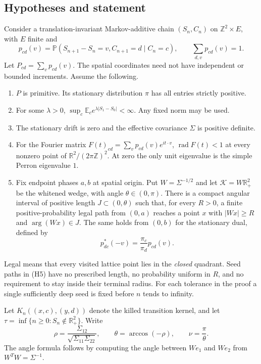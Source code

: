 \documentclass[11pt,letterpaper]{article}
\numberwithin{equation}{section}
\theoremstyle{remark}\newtheorem{remark}[theorem]{Remark}
\newcommand{\PP}{\mathbb P}
\newcommand{\EE}{\mathbb E}
\newcommand{\ZZ}{\mathbb Z}
\newcommand{\RR}{\mathbb R}
\newcommand{\rad}{\operatorname{rad}}
\newcommand{\argu}{\operatorname{arg}}
\begin{document}
\subsection{Hypotheses and statement}
Consider a translation-invariant Markov-additive chain $(S_n,C_n)$ on
$\ZZ^2\times E$, with $E$ finite and
\[
 p_{cd}(v)=\PP(S_{n+1}-S_n=v,C_{n+1}=d\mid C_n=c),\qquad
 \sum_{d,v}p_{cd}(v)=1.
\]
Let $P_{cd}=\sum_v p_{cd}(v)$. The spatial coordinates need not have
independent or bounded increments. Assume the following.
\begin{enumerate}[label=\textup{(H\arabic*)}]
\item $P$ is primitive. Its stationary distribution $\pi$ has all entries
strictly positive.
\item For some $\lambda>0$, $\sup_c\EE_c e^{\lambda|S_1-S_0|}<\infty$.
Any fixed norm may be used.
\item The stationary drift is zero and the effective covariance
$\Sigma$ is positive definite.
\item For the Fourier matrix
$F(t)_{cd}=\sum_v p_{cd}(v)e^{it\cdot v}$,
$\rad F(t)<1$ at every nonzero point of
$\RR^2/(2\pi\ZZ)^2$. At zero the only unit eigenvalue is the simple
Perron eigenvalue $1$.
\item Fix endpoint phases $a,b$ at spatial origin. Put
$W=\Sigma^{-1/2}$ and let $\mathcal K=W\RR_+^2$ be the whitened wedge,
with angle $\theta\in(0,\pi)$. There is a compact angular interval of positive length
$J\subset(0,\theta)$ such that, for every $R>0$, a finite
positive-probability legal path from $(0,a)$ reaches a point $x$ with
$|Wx|\ge R$ and $\argu(Wx)\in J$. The same holds from $(0,b)$ for the
stationary dual, defined by
\begin{equation}\label{cps:log:eq:dual}
 p^*_{dc}(-v)=\frac{\pi_c}{\pi_d}p_{cd}(v).
\end{equation}
\end{enumerate}
Legal means that every visited lattice point lies in the \emph{closed}
quadrant. Seed paths in (H5) have no prescribed length, no probability
uniform in $R$, and no requirement to stay inside their terminal radius.
For each tolerance in the proof a single sufficiently deep seed is fixed
before $n$ tends to infinity.

Let $K_n((x,c),(y,d))$ denote the killed transition kernel, and let
$\tau=\inf\{n\ge0:S_n\notin\RR_+^2\}$. Write
\[
 \rho=\frac{\Sigma_{12}}{\sqrt{\Sigma_{11}\Sigma_{22}}},\qquad
 \theta=\arccos(-\rho),\qquad \nu=\frac\pi\theta.
\]
The angle formula follows by computing the angle between $We_1$ and
$We_2$ from $W^TW=\Sigma^{-1}$.
\end{document}
